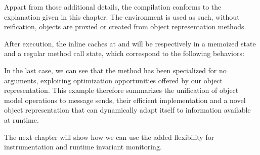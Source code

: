 Appart from those additional details, the compilation conforms to the
explanation given in this chapter. The environment is used as such, without
reification, objects are proxied or created from object representation methods.

After execution, the inline caches at  and  will
be respectively in a memoized state and a regular method call state, which
correspond to the following behaviors: 


In the last case, we can see that the  method has been specialized for
no arguments, exploiting optimization opportunities offered by our object
representation. This example therefore summarizes the unification of object
model operations to message sends, their efficient implementation and a novel
object representation that can dynamically adapt itself to information
available at runtime.

The next chapter will show how we can use the added flexibility for
instrumentation and runtime invariant monitoring.



